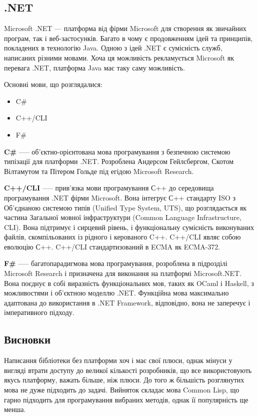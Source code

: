 \subsection{.NET}
Microsoft .NET --- платформа від фірми Microsoft для створення як звичайних програм, так і веб-застосунків. Багато в чому є продовженням ідей та принципів, покладених в технологію Java. Одною з ідей .NET є сумісність служб, написаних різними мовами. Хоча ця можливість рекламується Microsoft як перевага .NET, платформа Java має таку саму можливість.

Основні мови, що розглядалися:
\begin{itemize}
	\item C\#
	\item C++/CLI
	\item F\#
\end{itemize}

\textbf{C\#} --— об'єктно-орієнтована мова програмування з безпечною системою типізації для платформи .NET. Розроблена Андерсом Гейлсбергом, Скотом Вілтамутом та Пітером Гольде під егідою Microsoft Research.

\textbf{C++/CLI} --— прив'язка мови програмування С++ до середовища програмування .NET фірми Microsoft. Вона інтегрує С++ стандарту ISO з Об'єднаною системою типів (Unified Type System, UTS), що розглядається як частина Загальної мовної інфраструктури (Common Language Infrastructure, CLI). Вона підтримує і сирцевий рівень, і функціональну сумісність виконуваних файлів, скомпільованих із рідного і керованого C++. C++/CLI являє собою еволюцію С++. C++/CLI стандартизований в ECMA як ECMA-372.

\textbf{F\#} --— багатопарадигмова мова програмування, розроблена в підрозділі Microsoft Research і призначена для виконання на платформі Microsoft.NET. Вона поєднує в собі виразність функціональних мов, таких як OCaml і Haskell, з можливостями і об'єктною моделлю .NET. Функційна мова максимально адаптована до використання в .NET Framework, відповідно, вона не заперечує і імперативного підходу.
\subsection{Висновки}
Написання бібліотеки без платформи хоч і має свої плюси, однак мінуси у вигляді втрати доступу до великої кількості розробників, що все використовують якусь платформу, важать більше, ніж плюси. До того ж більшість розглянутих мова не дуже підходить до задачі. Вийняток складає мова Common Lisp, що гарно підходить для програмування вибраних методів, однак її популярність ще менша.

